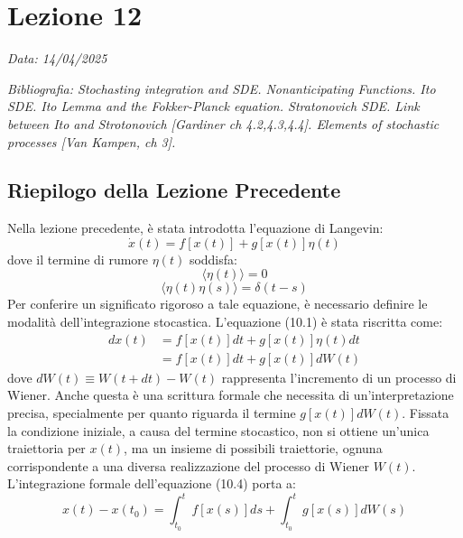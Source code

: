 \chapter{Lezione 12}
\label{chap:lezione_12} %

\begin{flushright}
\textit{Data: 14/04/2025}
\end{flushright}
\textit{Bibliografia: 
Stochasting integration and SDE. Nonanticipating Functions. Ito SDE. Ito Lemma and the Fokker-Planck equation. Stratonovich SDE. Link between Ito and Strotonovich [Gardiner ch 4.2,4.3,4.4]. Elements of stochastic processes [Van Kampen, ch 3]. }

\section{Riepilogo della Lezione Precedente}
Nella lezione precedente, è stata introdotta l'equazione di Langevin:
\begin{equation}
\dot{x}(t) = f[x(t)] + g[x(t)]\eta(t)
\end{equation}
dove il termine di rumore $\eta(t)$ soddisfa:
\begin{equation}
\langle\eta(t)\rangle = 0
\end{equation}
\begin{equation}
\langle\eta(t)\eta(s)\rangle = \delta(t-s)
\end{equation}
Per conferire un significato rigoroso a tale equazione, è necessario definire le modalità dell'integrazione stocastica. L'equazione (10.1) è stata riscritta come:
\begin{equation}
\begin{aligned}
dx(t) &= f[x(t)]dt + g[x(t)]\eta(t)dt \\ &= f[x(t)]dt + g[x(t)]dW(t)
\end{aligned}
\end{equation}
dove $dW(t) \equiv W(t+dt) - W(t)$ rappresenta l'incremento di un processo di Wiener.
Anche questa è una scrittura formale che necessita di un'interpretazione precisa, specialmente per quanto riguarda il termine $g[x(t)]dW(t)$. Fissata la condizione iniziale, a causa del termine stocastico, non si ottiene un'unica traiettoria per $x(t)$, ma un insieme di possibili traiettorie, ognuna corrispondente a una diversa realizzazione del processo di Wiener $W(t)$.
L'integrazione formale dell'equazione (10.4) porta a:
\begin{equation}
x(t) - x(t_0) = \int_{t_0}^{t} f[x(s)]ds + \int_{t_0}^{t} g[x(s)]dW(s)
\end{equation}
